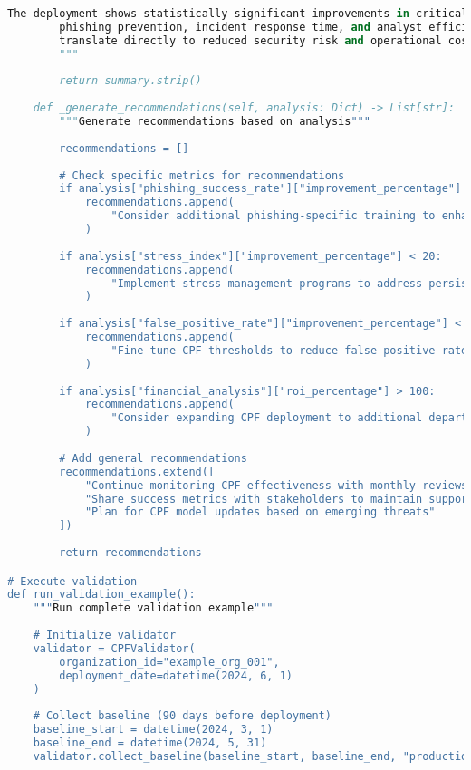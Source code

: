\documentclass[11pt,a4paper]{article}
\begin{document}
\begin{lstlisting}[language=Python, caption=CPF Validation Framework]
        The deployment shows statistically significant improvements in critical areas including
        phishing prevention, incident response time, and analyst efficiency. These improvements
        translate directly to reduced security risk and operational costs.
        """
        
        return summary.strip()
    
    def _generate_recommendations(self, analysis: Dict) -> List[str]:
        """Generate recommendations based on analysis"""
        
        recommendations = []
        
        # Check specific metrics for recommendations
        if analysis["phishing_success_rate"]["improvement_percentage"] < 30:
            recommendations.append(
                "Consider additional phishing-specific training to enhance CPF effectiveness"
            )
        
        if analysis["stress_index"]["improvement_percentage"] < 20:
            recommendations.append(
                "Implement stress management programs to address persistent team stress"
            )
        
        if analysis["false_positive_rate"]["improvement_percentage"] < 25:
            recommendations.append(
                "Fine-tune CPF thresholds to reduce false positive rates"
            )
        
        if analysis["financial_analysis"]["roi_percentage"] > 100:
            recommendations.append(
                "Consider expanding CPF deployment to additional departments"
            )
        
        # Add general recommendations
        recommendations.extend([
            "Continue monitoring CPF effectiveness with monthly reviews",
            "Share success metrics with stakeholders to maintain support",
            "Plan for CPF model updates based on emerging threats"
        ])
        
        return recommendations

# Execute validation
def run_validation_example():
    """Run complete validation example"""
    
    # Initialize validator
    validator = CPFValidator(
        organization_id="example_org_001",
        deployment_date=datetime(2024, 6, 1)
    )
    
    # Collect baseline (90 days before deployment)
    baseline_start = datetime(2024, 3, 1)
    baseline_end = datetime(2024, 5, 31)
    validator.collect_baseline(baseline_start, baseline_end, "production_db")
    

\end{lstlisting}
\end{document}
